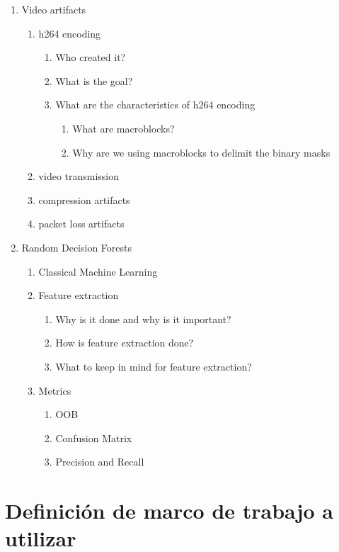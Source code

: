 \begin{enumerate}
\item Video artifacts
  \begin{enumerate}
  \item h264 encoding
    \begin{enumerate}
    \item Who created it?
    \item What is the goal?
    \item What are the characteristics of h264 encoding
      \begin{enumerate}
      \item What are macroblocks?
      \item Why are we using macroblocks to delimit the binary masks
      \end{enumerate}
    \end{enumerate}
  \item video transmission
  \item compression artifacts
  \item packet loss artifacts
  \end{enumerate}
\item Random Decision Forests
  \begin{enumerate}
  \item Classical Machine Learning
  \item Feature extraction
    \begin{enumerate}
    \item Why is it done and why is it important?
    \item How is feature extraction done?
    \item What to keep in mind for feature extraction?
    \end{enumerate}
  \item Metrics
    \begin{enumerate}
    \item OOB
    \item Confusion Matrix
    \item Precision and Recall
    \end{enumerate}
  \end{enumerate}
\end{enumerate}

\section{Definición de marco de trabajo a utilizar}

